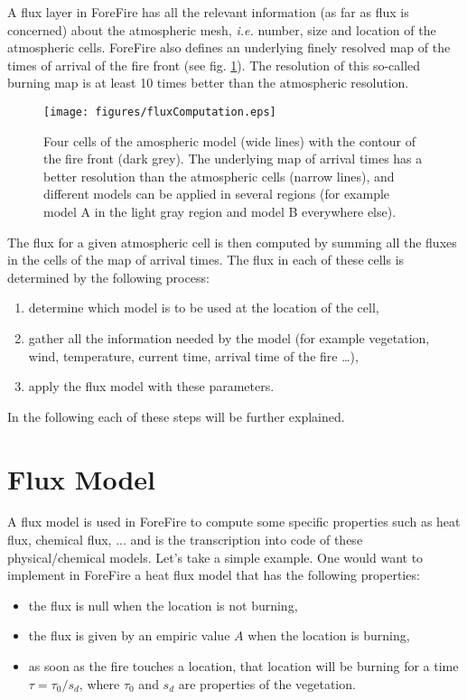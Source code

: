 A flux layer in ForeFire has all the relevant information (as far as flux is concerned) about the atmospheric mesh, \textit{i.e.} number, size and location of the atmospheric cells. ForeFire also defines an underlying finely resolved map of the times of arrival of the fire front (see fig. \ref{fig:fcomp}). The resolution of this so-called burning map is at least 10 times better than the atmospheric resolution.

\begin{figure}
\centering
\texttt{[image: figures/fluxComputation.eps]}
\caption{Four cells of the amospheric model (wide lines) with the contour of the fire front (dark grey). The underlying map of arrival times has a better resolution than the atmospheric cells (narrow lines), and different models can be applied in several regions (for example model A in the light gray region and model B everywhere else).\label{fig:fcomp}}
\end{figure}

The flux for a given atmospheric cell is then computed by summing all the fluxes in the cells of the map of arrival times. The flux in each of these cells is determined by the following process:
\begin{enumerate}
\item determine which model is to be used at the location of the cell,
\item gather all the information needed by the model (for example vegetation, wind, temperature, current time, arrival time of the fire \ldots),
\item apply the flux model with these parameters.
\end{enumerate}

In the following each of these steps will be further explained.

\section{Flux Model}

A flux model is used in ForeFire to compute some specific properties such as heat flux, chemical flux, ... and is the transcription into code of these physical/chemical models. Let's take a simple example. One would want to implement in ForeFire a heat flux model that has the following properties:
\begin{itemize}
\item the flux is null when the location is not burning,
\item the flux is given by an empiric value $A$ when the location is burning,
\item as soon as the fire touches a location, that location will be burning for a time $\tau=\tau_{0}/s_{d}$, where $\tau_{0}$ and $s_{d}$ are properties of the vegetation.
\end{itemize}

